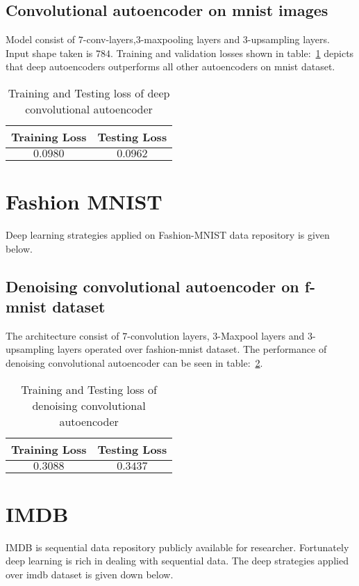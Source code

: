 \documentclass[12pt,a4paper,titlepage]{report}
\begin{document}
\subsection{Convolutional autoencoder on mnist images}
Model consist of $7$-conv-layers,$3$-maxpooling layers and $3$-upsampling layers. Input shape taken is $784$. Training and validation losses shown in table:~\ref{tab: Table-21} depicts that deep autoencoders outperforms all other autoencoders on mnist dataset.
\vspace{20pt}
\begin{table}[H]
\centering
\caption{Training and Testing loss of deep convolutional autoencoder}
\label{tab: Table-21}
\begin{tabular}{c c}
\hline
\textbf{Training Loss} & \textbf{Testing Loss}\\
\hline
$0.0980$ & $0.0962$\\
\hline
\end{tabular}
\end{table}

\section{Fashion MNIST}
Deep learning strategies applied on Fashion-MNIST data repository is given below.

\subsection{Denoising convolutional autoencoder on f-mnist dataset}
The architecture consist of $7$-convolution layers, $3$-Maxpool layers and $3$-upsampling layers operated over fashion-mnist dataset. The performance of denoising convolutional autoencoder can be seen in table:~\ref{tab: Table-22}. 
\vspace{20pt}
\begin{table}[H]
\centering
\caption{Training and Testing loss of denoising convolutional autoencoder}
\label{tab: Table-22}
\begin{tabular}{c c}
\hline
\textbf{Training Loss} & \textbf{Testing Loss}\\
\hline
$0.3088$ & $0.3437$\\
\hline
\end{tabular}
\end{table}

\section{IMDB}
IMDB is sequential data repository publicly available for researcher. Fortunately  deep learning is rich in dealing with sequential data. The deep strategies applied over imdb dataset is given down below.
\end{document}
